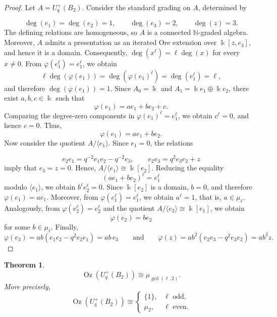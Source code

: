 \documentclass[11pt]{article}
\newtheorem{theorem}{Theorem}[section]
\theoremstyle{definition}
\newcommand{\K}{\Bbbk}
\begin{document}
\begin{proof}
Let \(A=U_q^+(B_2)\). Consider the standard grading on \(A\), determined by

$$
\deg(e_1)=\deg(e_2)=1,\qquad
\deg(e_3)=2,\qquad
\deg(z)=3.
$$
The defining relations are homogeneous, so \(A\) is a connected
\(\mathbb N\)-graded algebra. Moreover, \(A\) admits a presentation as an
iterated Ore extension over \(\K[z,e_3]\), and hence it is a domain.
Consequently, \(\deg(x^\ell)=\ell\deg(x)\) for every \(x\neq0\). From
\(\varphi(e_1^\ell)=e_1^\ell\), we obtain
$$
\ell\deg(\varphi(e_1))
=\deg(\varphi(e_1)^\ell)
=\deg(e_1^\ell)
=\ell,
$$
and therefore \(\deg(\varphi(e_1))=1\). Since
\(A_0=\K\) and \(A_1=\K e_1\oplus\K e_2\), there exist \(a,b,c\in\K\) such that
$$
\varphi(e_1)=ae_1+be_2+c.
$$
Comparing the degree-zero components in
\(\varphi(e_1)^\ell=e_1^\ell\), we obtain \(c^\ell=0\), and hence \(c=0\). Thus,
$$
\varphi(e_1)=ae_1+be_2.
$$
Now consider the quotient \(A/\langle e_1\rangle\). Since \(e_1=0\), the relations

$$
e_2e_1=q^{-2}e_1e_2-q^{-2}e_3,
\qquad
e_2e_3=q^2e_3e_2+z
$$
imply that \(e_3=z=0\). Hence, \(A/\langle e_1\rangle\cong\K[e_2]\). Reducing the equality
$$
(ae_1+be_2)^\ell=e_1^\ell
$$
modulo \(\langle e_1\rangle\), we obtain \(b^\ell e_2^\ell=0\). Since
\(\K[e_2]\) is a domain, \(b=0\), and therefore \(\varphi(e_1)=ae_1\).
Moreover, from \(\varphi(e_1^\ell)=e_1^\ell\), we obtain \(a^\ell=1\), that is,
\(a\in\mu_\ell\).
\noindent Analogously, from \(\varphi(e_2^\ell)=e_2^\ell\) and the quotient
\(A/\langle e_2\rangle\cong\K[e_1]\), we obtain
$$
\varphi(e_2)=be_2
$$
for some \(b\in\mu_\ell\). Finally,
$$
\varphi(e_3)=ab(e_1e_2-q^2e_2e_1)=ab\,e_3
\qquad\text{and}\qquad
\varphi(z)=ab^2(e_2e_3-q^2e_3e_2)=ab^2z.
$$
\end{proof}
\begin{theorem}\label{ozono-UqB2}
$$
\operatorname{Oz}(U_q^+(B_2))\cong \mu_{\gcd(\ell,2)}.
$$
More precisely,
$$
\operatorname{Oz}(U_q^+(B_2))
\cong
\begin{cases}
\{1\},&\ell\text{ odd},\\[1mm]
\mu_2,&\ell\text{ even}.
\end{cases}
$$
\end{theorem}
\end{document}
